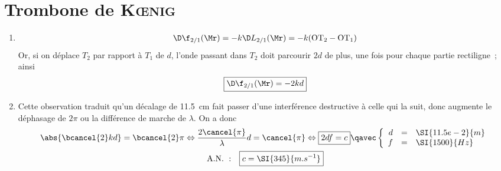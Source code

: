 \documentclass[a4paper, 12pt, final, garamond]{book}
\begin{document}
\section{Trombone de \textsc{Kœnig}}
\begin{enumerate}
    \item 
        \begin{gather*}
            \D\f_{2/1}(\Mr) = -k\D L_{2/1}(\Mr) = -k(\rm OT_2 - OT_1)
        \end{gather*}
        Or, si on déplace $T_2$ par rapport à $T_1$ de $d$, l'onde passant dans
        $T_2$ doit parcourir $2d$ de plus, une fois pour chaque partie
        rectiligne~; ainsi
        \[\boxed{\D\f_{2/1}(\Mr) = -2kd}\]
    \item Cette observation traduit qu'un décalage de \SI{11.5}{cm} fait passer
        d'une interférence destructive à celle qui la suit, donc augmente le
        déphasage de $2\pi$ ou la différence de marche de $\lambda$. On a donc
        \begin{gather*}
            \abs{\bcancel{2}kd} = \bcancel{2}\pi
            \Leftrightarrow
            \frac{2\cancel{\pi}}{\lambda}d = \cancel{\pi}
            \Leftrightarrow
            \boxed{2df = c}
            \qavec
            \left\{
                \begin{array}{rcl}
                    d & = & \SI{11.5e-2}{m}\\
                    f & = & \SI{1500}{Hz}
                \end{array}
            \right.\\
            \mathrm{A.N.~:}\quad
            \boxed{c = \SI{345}{m.s^{-1}}}
        \end{gather*}
\end{enumerate}
\end{document}
